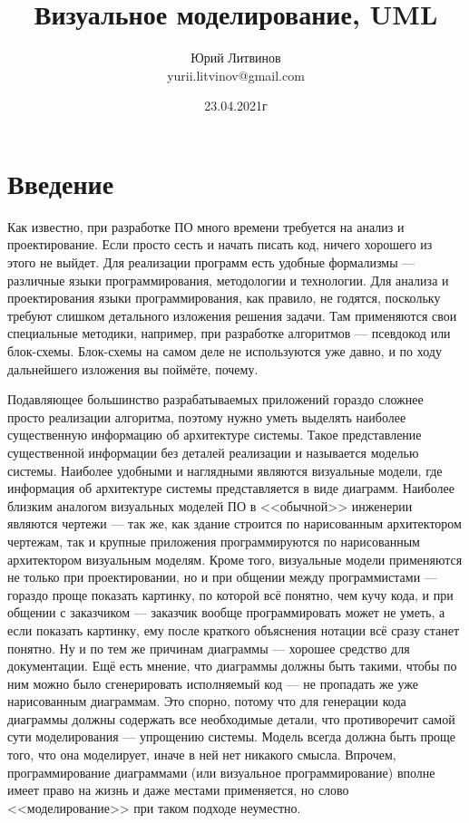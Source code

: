 \documentclass[a5paper]{article}
\title{Визуальное моделирование, UML}
\author{Юрий Литвинов\\\small{yurii.litvinov@gmail.com}}
\date{23.04.2021г}
\begin{document}
\maketitle
\thispagestyle{empty}

\section{Введение}

Как известно, при разработке ПО много времени требуется на анализ и проектирование. Если просто сесть и начать писать код, ничего хорошего из этого не выйдет. Для реализации программ есть удобные формализмы --- различные языки программирования, методологии и технологии. Для анализа и проектирования языки программирования, как правило, не годятся, поскольку требуют слишком детального изложения решения задачи. Там применяются свои специальные методики, например, при разработке алгоритмов --- псевдокод или блок-схемы. Блок-схемы на самом деле не используются уже давно, и по ходу дальнейшего изложения вы поймёте, почему.

Подавляющее большинство разрабатываемых приложений гораздо сложнее просто реализации алгоритма, поэтому нужно уметь выделять наиболее существенную информацию об архитектуре системы. Такое представление существенной информации без деталей реализации и называется моделью системы. Наиболее удобными и наглядными являются визуальные модели, где информация об архитектуре системы представляется в виде диаграмм. Наиболее близким аналогом визуальных моделей ПО в <<обычной>> инженерии являются чертежи --- так же, как здание строится по нарисованным архитектором чертежам, так и крупные приложения программируются по нарисованным архитектором визуальным моделям. Кроме того, визуальные модели применяются не только при проектировании, но и при общении между программистами --- гораздо проще показать картинку, по которой всё понятно, чем кучу кода, и при общении с заказчиком --- заказчик вообще программировать может не уметь, а если показать картинку, ему после краткого объяснения нотации всё сразу станет понятно. Ну и по тем же причинам диаграммы --- хорошее средство для документации. Ещё есть мнение, что диаграммы должны быть такими, чтобы по ним можно было сгенерировать исполняемый код --- не пропадать же уже нарисованным диаграммам. Это спорно, потому что для генерации кода диаграммы должны содержать все необходимые детали, что противоречит самой сути моделирования --- упрощению системы. Модель всегда должна быть проще того, что она моделирует, иначе в ней нет никакого смысла. Впрочем, программирование диаграммами (или визуальное программирование) вполне имеет право на жизнь и даже местами применяется, но слово <<моделирование>> при таком подходе неуместно.
\end{document}
